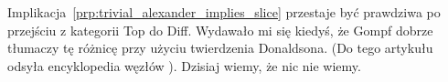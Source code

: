 Implikacja~\ref{prp:trivial_alexander_implies_slice} przestaje być prawdziwa po przejściu z kategorii Top do Diff.
Wydawało mi się kiedyś, że Gompf \cite{gompf86} dobrze tłumaczy tę różnicę przy użyciu twierdzenia Donaldsona.
%
%
(Do tego artykułu odsyła encyklopedia węzłów \cite{adams21}).
Dzisiaj wiemy, że nic nie wiemy.









